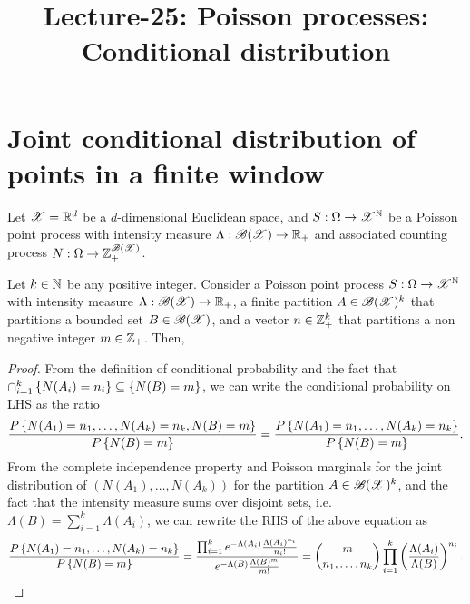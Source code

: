 \documentclass[letterpaper,10pt,english]{article}
\title{Lecture-25: Poisson processes: Conditional distribution}
\author{}
\begin{document}
\maketitle


\section{Joint conditional distribution of points in a finite window}
Let $\mathscr{X} =\mathbb{R}^d$ be a $d$-dimensional Euclidean space, 
and $S:\Omega\to\mathscr{X}^{\mathbb{N}}$ be a Poisson point process with intensity measure $\Lambda: \mathscr{B}(\mathscr{X}) \to \mathbb{R}_+$ and associated counting process $N:\Omega\to\mathbb{Z}_+^{\mathscr{B}(\mathscr{X})}$.
\begin{prop} 
Let $k \in \mathbb{N}$ be any positive integer. 
Consider a Poisson point process $S: \Omega \to \mathscr{X}^{\mathbb{N}}$ with intensity measure $\Lambda:\mathscr{B}(\mathscr{X})\to\mathbb{R}_+$,  
a finite partition $A\in \mathscr{B}(\mathscr{X})^k$ that partitions a bounded set $B \in \mathscr{B}(\mathscr{X})$, 
and a vector $n \in \mathbb{Z}_+^k$ that partitions a non negative integer $m \in \mathbb{Z}_+$. 
Then, 
\end{prop}
\begin{proof} 
From the definition of conditional probability and the fact that $\cap_{i=1}^k\left\{N(A_i) = n_i\right\} \subseteq \left\{N(B) =m\right\}$, we can write the conditional probability on LHS as the ratio 
\begin{equation*}
\frac{P\left\{N(A_1) = n_1, \dots, N(A_k) = n_k, N(B) = m\right\}}{P\left\{N(B) = m\right\}} = 
\frac{P\left\{N(A_1) = n_1, \dots, N(A_k) = n_k\right\}}{P\left\{N(B) = m\right\}}.
\end{equation*}
From the complete independence property and Poisson marginals for the joint distribution of $(N(A_1), \dots, N(A_k))$ for the partition $A \in \mathscr{B}(\mathscr{X})^k$, 
and the fact that the intensity measure sums over disjoint sets, i.e. $\Lambda(B) = \sum_{i=1}^k\Lambda(A_i)$, we can rewrite the RHS of the above equation as 
\begin{equation*}
\frac{P\left\{N(A_1) = n_1, \dots, N(A_k) = n_k\right\}}{P\left\{N(B) = m\right\}}
= \frac{\prod_{i=1}^ke^{-\Lambda(A_i)}\frac{\Lambda(A_i)^{n_i}}{n_i!}}{e^{-\Lambda(B)}\frac{\Lambda(B)^m}{m!}}
= \binom{m}{n_1, \dots, n_k}\prod_{i=1}^k\left(\frac{\Lambda(A_i)}{\Lambda(B)}\right)^{n_i}.
\end{equation*}
\end{proof}
\end{document}
